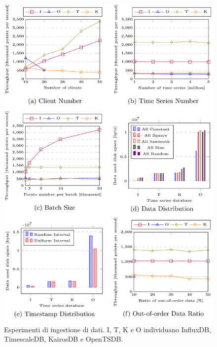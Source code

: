 \begin{figure}[!ht]
    \centering
    \includegraphics[scale=0.34]{images/data_ingestion_benchmark.png}
    \caption{Esperimenti di ingestione di dati. I, T, K e O individuano InfluxDB, TimescaleDB, KairosDB e OpenTSDB.}
    \label{tab:data_ingestion_benchmark}
\end{figure}


